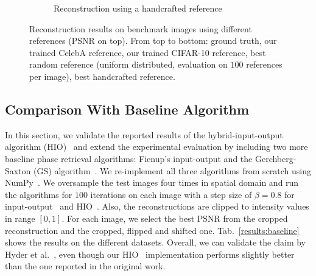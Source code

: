 \begin{figure}
\begin{subfigure}{\textwidth}
		\caption{Reconstruction using a handcrafted reference }
	\end{subfigure}
	\caption{Reconstruction results on benchmark images using different references (PSNR on top). From top to bottom: ground truth, our trained CelebA reference, our trained CIFAR-10 reference,  best random reference (uniform distributed, evaluation on $100$ references per image), best handcrafted reference.}
	\label{images}
\end{figure}

\subsection{Comparison With Baseline Algorithm}

In this section, we validate the reported results of the hybrid-input-output algorithm (HIO)~\cite{Fienup:82} and extend the experimental evaluation by including two more baseline phase retrieval algorithms: Fienup's input-output and the Gerchberg-Saxton (GS) algorithm~\cite{Gerchberg1972APA}. We re-implement all three algorithms from scratch using NumPy~\cite{numpy}. We oversample the test images four times in spatial domain and run the algorithms for $100$ iterations on each image with a step size of $\beta=0.8$ for input-output~\cite{Fienup:82} and HIO~\cite{Fienup:82}. Also, the reconstructions are clipped to intensity values in range $[0, 1]$. For each image, we select the best PSNR from the cropped reconstruction and the cropped, flipped and shifted one. Tab.~\ref{results:baseline} shows the results on the different datasets. Overall, we can validate the claim by Hyder et al.~\cite{hyder2020solving}, even though our HIO~\cite{Fienup:82} implementation performs slightly better than the one reported in the original work.

